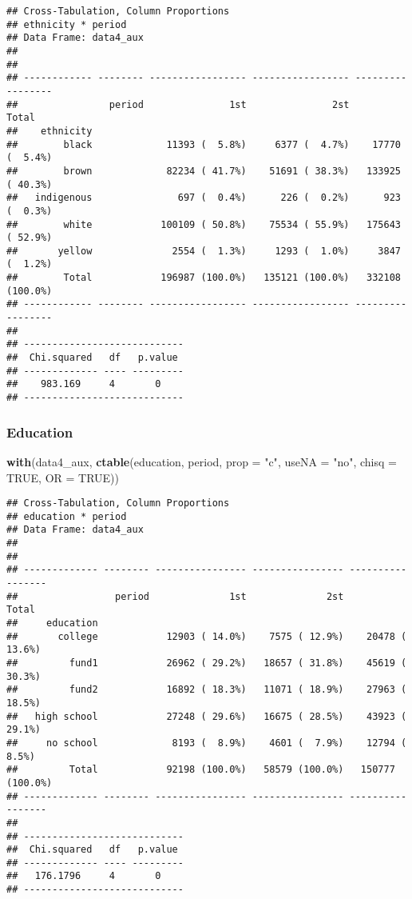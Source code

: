 \documentclass[
]{article}
\newenvironment{Shaded}{\begin{snugshade}}{\end{snugshade}}
\newcommand{\DataTypeTok}[1]{\textcolor[rgb]{0.13,0.29,0.53}{#1}}
\newcommand{\KeywordTok}[1]{\textcolor[rgb]{0.13,0.29,0.53}{\textbf{#1}}}
\newcommand{\NormalTok}[1]{#1}
\newcommand{\OtherTok}[1]{\textcolor[rgb]{0.56,0.35,0.01}{#1}}
\newcommand{\StringTok}[1]{\textcolor[rgb]{0.31,0.60,0.02}{#1}}
\begin{document}
\begin{verbatim}
## Cross-Tabulation, Column Proportions  
## ethnicity * period  
## Data Frame: data4_aux  
## 
## 
## ------------ -------- ----------------- ----------------- -----------------
##                period               1st               2st             Total
##    ethnicity                                                               
##        black             11393 (  5.8%)     6377 (  4.7%)    17770 (  5.4%)
##        brown             82234 ( 41.7%)    51691 ( 38.3%)   133925 ( 40.3%)
##   indigenous               697 (  0.4%)      226 (  0.2%)      923 (  0.3%)
##        white            100109 ( 50.8%)    75534 ( 55.9%)   175643 ( 52.9%)
##       yellow              2554 (  1.3%)     1293 (  1.0%)     3847 (  1.2%)
##        Total            196987 (100.0%)   135121 (100.0%)   332108 (100.0%)
## ------------ -------- ----------------- ----------------- -----------------
## 
## ----------------------------
##  Chi.squared   df   p.value 
## ------------- ---- ---------
##    983.169     4       0    
## ----------------------------
\end{verbatim}

\hypertarget{education}{%
\subsubsection{Education}\label{education}}

\begin{Shaded}
\begin{Highlighting}[]
\KeywordTok{with}\NormalTok{(data4_aux, }\KeywordTok{ctable}\NormalTok{(education, period, }\DataTypeTok{prop =} \StringTok{"c"}\NormalTok{, }\DataTypeTok{useNA =} \StringTok{"no"}\NormalTok{, }\DataTypeTok{chisq =} \OtherTok{TRUE}\NormalTok{, }\DataTypeTok{OR =} \OtherTok{TRUE}\NormalTok{))}
\end{Highlighting}
\end{Shaded}

\begin{verbatim}
## Cross-Tabulation, Column Proportions  
## education * period  
## Data Frame: data4_aux  
## 
## 
## ------------- -------- ---------------- ---------------- -----------------
##                 period              1st              2st             Total
##     education                                                             
##       college            12903 ( 14.0%)    7575 ( 12.9%)    20478 ( 13.6%)
##         fund1            26962 ( 29.2%)   18657 ( 31.8%)    45619 ( 30.3%)
##         fund2            16892 ( 18.3%)   11071 ( 18.9%)    27963 ( 18.5%)
##   high school            27248 ( 29.6%)   16675 ( 28.5%)    43923 ( 29.1%)
##     no school             8193 (  8.9%)    4601 (  7.9%)    12794 (  8.5%)
##         Total            92198 (100.0%)   58579 (100.0%)   150777 (100.0%)
## ------------- -------- ---------------- ---------------- -----------------
## 
## ----------------------------
##  Chi.squared   df   p.value 
## ------------- ---- ---------
##   176.1796     4       0    
## ----------------------------
\end{verbatim}
\end{document}
